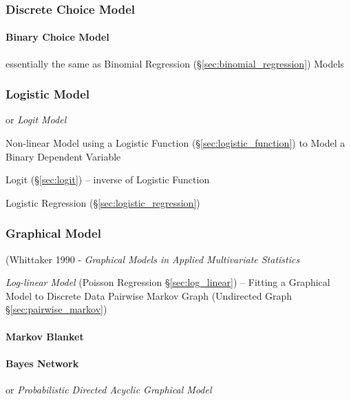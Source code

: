 \subsubsection{Discrete Choice Model}\label{sec:discrete_choice_model}

\paragraph{Binary Choice Model}\label{sec:binary_choice}\hfill

essentially the same as Binomial Regression
(\S\ref{sec:binomial_regression}) Models



\subsubsection{Logistic Model}\label{sec:discrete_uniform_law}

or \emph{Logit Model}

Non-linear Model using a Logistic Function (\S\ref{sec:logistic_function}) to
Model a Binary Dependent Variable

Logit (\S\ref{sec:logit}) -- inverse of Logistic Function

Logistic Regression (\S\ref{sec:logistic_regression})



\subsubsection{Graphical Model}\label{sec:graphical_model}

(Whittaker 1990 - \emph{Graphical Models in Applied Multivariate Statistics}

\fist \emph{Log-linear Model} (Poisson Regression \S\ref{sec:log_linear}) --
Fitting a Graphical Model to Discrete Data \fist Pairwise Markov Graph
(Undirected Graph \S\ref{sec:pairwise_markov})



\paragraph{Markov Blanket}\label{sec:markov_blanket}\hfill

\paragraph{Bayes Network}\label{sec:bayes_network}\hfill

or \emph{Probabilistic Directed Acyclic Graphical Model}


